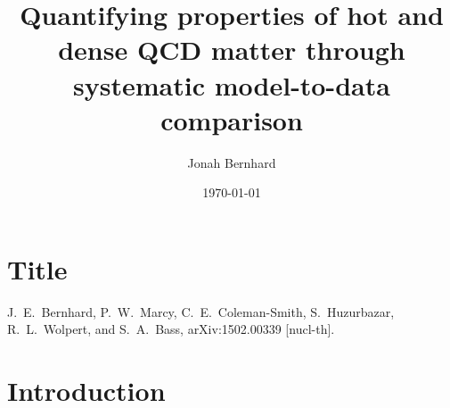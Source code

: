 \documentclass{beamer}
\title{Quantifying properties of hot and dense QCD matter through systematic model-to-data comparison}
\author{Jonah Bernhard}
\institute{QCD group meeting}
\date{\today}
\begin{document}
\section{Title}

\begin{frame}
  \maketitle
  \tiny
  J.~E.~Bernhard, P.~W.~Marcy, C.~E.~Coleman-Smith, S.~Huzurbazar, R.~L.~Wolpert, and S.~A.~Bass,
  arXiv:1502.00339 [nucl-th].
\end{frame}


\section{Introduction}
\end{document}

